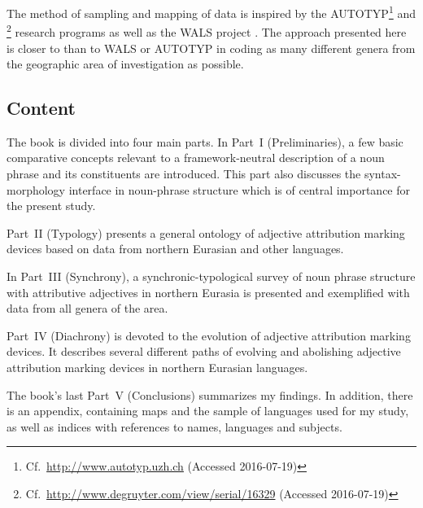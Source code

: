 The method of sampling and mapping of data is inspired by the \textsc{AUTOTYP}\footnote{Cf.~\url{http://www.autotyp.uzh.ch} (Accessed 2016-07-19)} and \textsc{}\footnote{Cf.~\url{http://www.degruyter.com/view/serial/16329} (Accessed 2016-07-19)} research programs as well as the \textsc{WALS} project \citep{walsOnline2013}. The approach presented here is closer to \textsc{} than to \textsc{WALS} or \textsc{AUTOTYP} in coding as many different genera from the geographic area of investigation as possible.

\subsection*{Content}
The book is divided into four main parts. In Part~I (Preliminaries), a few basic comparative concepts relevant to a framework-neutral description of a noun phrase and its constituents are introduced. This part also discusses the syntax-morphology interface in noun-phrase structure which is of central importance for the present study.

Part~II (Typology) presents a general ontology of adjective attribution marking devices based on data from northern Eurasian and other languages.

In Part~III (Synchrony), a synchronic-typological survey of noun phrase structure with attributive adjectives in northern Eurasia is presented and exemplified with data from all genera of the area.

Part~IV (Diachrony) is devoted to the evolution of adjective attribution marking devices. It describes several different paths of evolving and abolishing adjective attribution marking devices in northern Eurasian languages.

The book's last Part~V (Conclusions) summarizes my findings. In addition, there is an appendix, containing maps and the sample of languages used for my study, as well as indices with references to names, languages and subjects.
